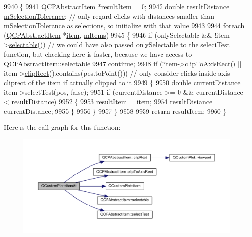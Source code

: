 \begin{DoxyCode}
9940 \{
9941   \hyperlink{class_q_c_p_abstract_item}{QCPAbstractItem} *resultItem = 0;
9942   \textcolor{keywordtype}{double} resultDistance = \hyperlink{class_q_custom_plot_abc36e12dd0482117ad810a800c847722}{mSelectionTolerance}; \textcolor{comment}{// only regard clicks with distances
       smaller than mSelectionTolerance as selections, so initialize with that value}
9943   
9944   \textcolor{keywordflow}{foreach} (\hyperlink{class_q_c_p_abstract_item}{QCPAbstractItem} *\hyperlink{class_q_custom_plot_a700399eae539798c5baf64a37c7f2135}{item}, \hyperlink{class_q_custom_plot_a6a93905372326e31e98d6c3bc8953ec8}{mItems})
9945   \{
9946     \textcolor{keywordflow}{if} (onlySelectable && !item->\hyperlink{class_q_c_p_abstract_item_a9189e752025533e1595eaade0009a3bc}{selectable}()) \textcolor{comment}{// we could have also passed onlySelectable to the
       selectTest function, but checking here is faster, because we have access to QCPAbstractItem::selectable}
9947       \textcolor{keywordflow}{continue};
9948     \textcolor{keywordflow}{if} (!item->\hyperlink{class_q_c_p_abstract_item_a5b0ea171823033bcb8aee81f4a034871}{clipToAxisRect}() || item->\hyperlink{class_q_c_p_abstract_item_a538e25ff8856534582f5b2b400a46405}{clipRect}().contains(pos.toPoint())) \textcolor{comment}{// only
       consider clicks inside axis cliprect of the item if actually clipped to it}
9949     \{
9950       \textcolor{keywordtype}{double} currentDistance = item->\hyperlink{class_q_c_p_abstract_item_a96d522d10ffc0413b9a366c6f7f0476b}{selectTest}(pos, \textcolor{keyword}{false});
9951       \textcolor{keywordflow}{if} (currentDistance >= 0 && currentDistance < resultDistance)
9952       \{
9953         resultItem = \hyperlink{class_q_custom_plot_a700399eae539798c5baf64a37c7f2135}{item};
9954         resultDistance = currentDistance;
9955       \}
9956     \}
9957   \}
9958   
9959   \textcolor{keywordflow}{return} resultItem;
9960 \}
\end{DoxyCode}


Here is the call graph for this function\+:\nopagebreak
\begin{figure}[H]
\begin{center}
\leavevmode
\includegraphics[width=350pt]{class_q_custom_plot_a793e4b04e0ede11a733021907368fa83_cgraph}
\end{center}
\end{figure}


